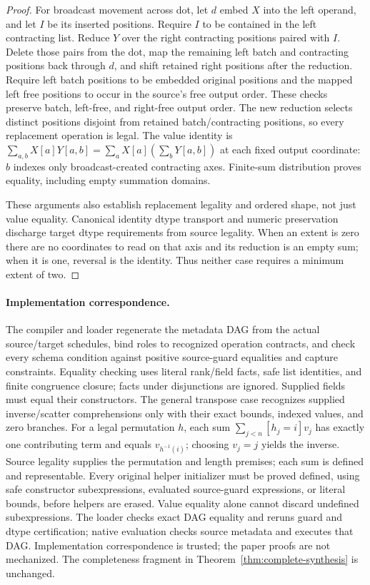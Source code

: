 \begin{proof}
For broadcast movement across dot, let $d$ embed $X$ into the left operand,
and let $I$ be its inserted positions. Require $I$ to be contained in the
left contracting list. Reduce $Y$ over the right contracting positions paired
with $I$. Delete those pairs from the dot, map the remaining left batch and
contracting positions back through $d$, and shift retained right positions
after the reduction. Require left batch positions to be embedded original
positions and the mapped left free positions to occur in the source's free
output order. These checks preserve batch, left-free, and right-free output
order. The new reduction selects distinct positions disjoint from retained
batch/contracting positions, so every replacement operation is legal. The
value identity is
$\sum_{a,b}X[a]Y[a,b]=\sum_a X[a](\sum_bY[a,b])$ at each fixed output
coordinate: $b$ indexes only broadcast-created contracting axes. Finite-sum
distribution proves equality, including empty summation domains.

These arguments also establish replacement legality and ordered shape,
not just value equality. Canonical identity dtype transport and numeric
preservation discharge target dtype requirements from source legality.
When an extent is zero there are no coordinates to read on that axis and
its reduction is an empty sum; when it is one, reversal is the identity.
Thus neither case requires a minimum extent of two.
\end{proof}

\paragraph{Implementation correspondence.}
The compiler and loader regenerate the metadata DAG from the actual
source/target schedules, bind roles to recognized operation contracts,
and check every schema condition against positive source-guard equalities
and capture constraints. Equality checking uses literal rank/field facts,
safe list identities, and finite congruence closure; facts under disjunctions
are ignored. Supplied fields must equal their constructors. The general transpose case recognizes supplied
inverse/scatter comprehensions only with their exact bounds, indexed values,
and zero branches. For a legal permutation $h$, each sum
$\sum_{j<n}[h_j=i]v_j$ has exactly one contributing term and equals
$v_{h^{-1}(i)}$; choosing $v_j=j$ yields the inverse. Source legality supplies the permutation and length premises; each sum is
defined and representable. Every original helper initializer must be proved defined, using safe
constructor subexpressions, evaluated source-guard expressions, or literal
bounds, before helpers are erased. Value equality alone cannot discard
undefined subexpressions. The loader checks exact DAG equality and reruns guard
and dtype certification; native evaluation checks source metadata and
executes that DAG. Implementation correspondence is trusted; the paper proofs are not mechanized.
The completeness fragment in Theorem~\ref{thm:complete-synthesis} is unchanged.

